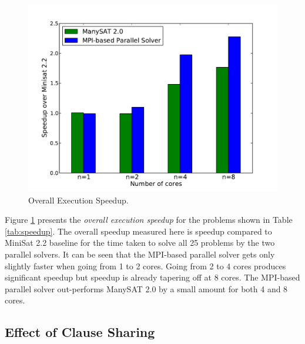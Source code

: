 \documentclass[letterpaper, compsoc, conference]{IEEEtran}
\begin{document}
\begin{figure}[htbp]
    \begin{center}
        \includegraphics[width=\columnwidth]{images/speedup1.pdf}
        \caption{Overall Execution Speedup.}
        \label{fig:speedup}
    \end{center}
\end{figure}

Figure \ref{fig:speedup} presents the \emph{overall execution speedup} for the
problems shown in Table \ref{tab:speedup}. The overall speedup measured here is
speedup compared to MiniSat 2.2 baseline for the time taken to solve all 25
problems by the two parallel solvers. It can be seen that the MPI-based
parallel solver gets only slightly faster when going from 1 to 2 cores. Going
from 2 to 4 cores produces significant speedup but speedup is already tapering
off at 8 cores. The MPI-based parallel solver out-performs ManySAT 2.0 by a
small amount for both 4 and 8 cores.

\subsection{Effect of Clause Sharing}
\label{sec:sharing effects}
\end{document}
